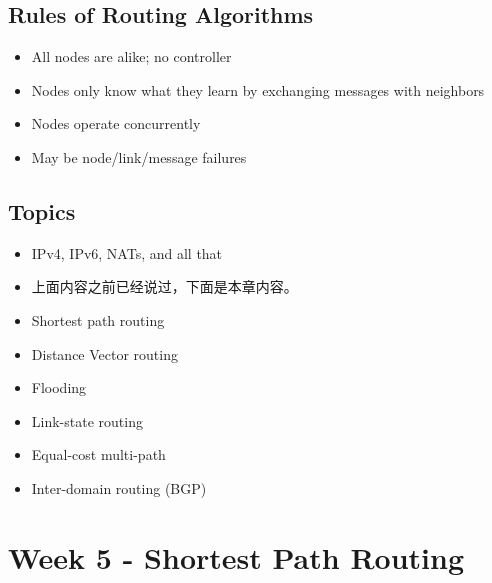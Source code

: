\documentclass[12pt]{ctexart}   %
\begin{document}
	\subsection{Rules of Routing Algorithms}
	\begin{itemize}
		\item All nodes are alike; no controller
		\item Nodes only know what they learn by exchanging messages with neighbors
		\item Nodes operate concurrently
		\item May be node/link/message failures
	\end{itemize}
	
	\subsection{Topics}
	\begin{itemize}
		\item IPv4, IPv6, NATs, and all that
		\item 上面内容之前已经说过，下面是本章内容。
		\item Shortest path routing
		\item Distance Vector routing
		\item Flooding
		\item Link-state routing
		\item Equal-cost multi-path
		\item Inter-domain routing (BGP)
	\end{itemize}
	
\section{Week 5 - Shortest Path Routing}
\end{document}
